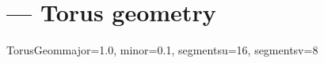 
\section{ ---
         Torus geometry}

\begin{classdesc}{TorusGeom}{major=1.0, minor=0.1, segmentsu=16, segmentsv=8}
\end{classdesc}







